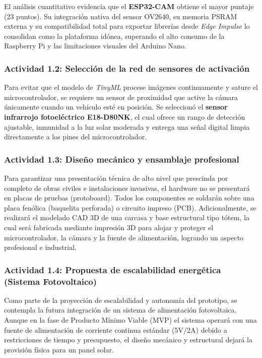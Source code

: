\documentclass[12pt, letterpaper]{article}
\begin{document}
El análisis cuantitativo evidencia que el \textbf{ESP32-CAM} obtiene el mayor puntaje (23 puntos). Su integración nativa del sensor OV2640, su memoria PSRAM externa y su compatibilidad total para exportar librerías desde \textit{Edge Impulse} lo consolidan como la plataforma idónea, superando el alto consumo de la Raspberry Pi y las limitaciones visuales del Arduino Nano.

\subsubsection{Actividad 1.2: Selección de la red de sensores de activación}
Para evitar que el modelo de \textit{TinyML} procese imágenes continuamente y sature el microcontrolador, se requiere un sensor de proximidad que active la cámara únicamente cuando un vehículo esté en posición. Se seleccionó el \textbf{sensor infrarrojo fotoeléctrico E18-D80NK}, el cual ofrece un rango de detección ajustable, inmunidad a la luz solar moderada y entrega una señal digital limpia directamente a los pines del microcontrolador.

\subsubsection{Actividad 1.3: Diseño mecánico y ensamblaje profesional}
Para garantizar una presentación técnica de alto nivel que prescinda por completo de obras civiles e instalaciones invasivas, el hardware no se presentará en placas de pruebas (protoboard). Todos los componentes se soldarán sobre una placa fenólica (baquelita perforada) o circuito impreso (PCB). Adicionalmente, se realizará el modelado CAD 3D de una carcasa y base estructural tipo tótem, la cual será fabricada mediante impresión 3D para alojar y proteger el microcontrolador, la cámara y la fuente de alimentación, logrando un aspecto profesional e industrial.

\subsubsection{Actividad 1.4: Propuesta de escalabilidad energética (Sistema Fotovoltaico)}
Como parte de la proyección de escalabilidad y autonomía del prototipo, se contempla la futura integración de un sistema de alimentación fotovoltaica. Aunque en la fase de Producto Mínimo Viable (MVP) el sistema operará con una fuente de alimentación de corriente continua estándar (5V/2A) debido a restricciones de tiempo y presupuesto, el diseño mecánico y estructural dejará la provisión física para un panel solar.
\end{document}
